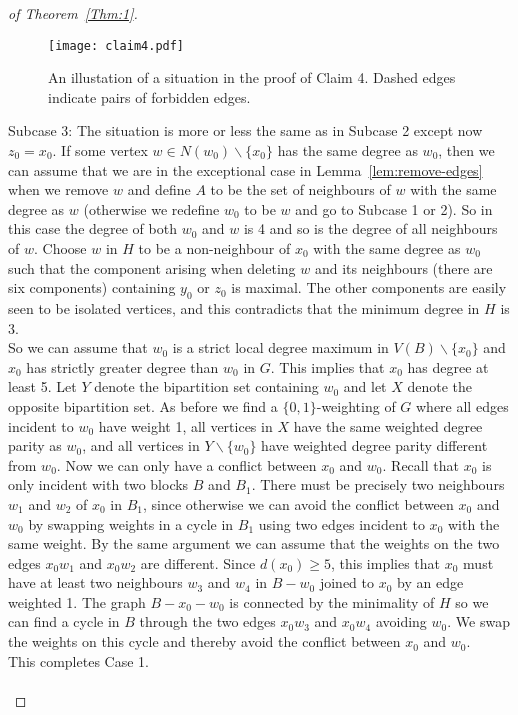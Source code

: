\documentclass[
final,
 nomarks,
]{dmtcs-episciences}
\theoremstyle{definition}
\begin{document}
\begin{proof}[of Theorem~\ref{Thm:1}]
\begin{figure}[H]
\centering
\texttt{[image: claim4.pdf]}
\caption{An illustation of a situation in the proof of Claim 4. Dashed edges indicate pairs of forbidden edges.}
\label{fig:claim4}
\end{figure}
\noindent Subcase 3: The situation is more or less the same as in Subcase 2 except now $z_0=x_0$. If some vertex $w \in N(w_0)\backslash \{x_0\}$ has the same degree as $w_0$, then we can assume that we are in the exceptional case in Lemma~\ref{lem:remove-edges} when we remove $w$ and define $A$ to be the set of neighbours of $w$ with the same degree as $w$ (otherwise we redefine $w_0$ to be $w$ and go to Subcase 1 or 2). So in this case the degree of both $w_0$ and $w$ is 4 and so is the degree of all neighbours of $w$. Choose $w$ in $H$ to be a non-neighbour of $x_0$ with the same degree as $w_0$ such that the component arising when deleting $w$ and its neighbours (there are six components) containing $y_0$ or $z_0$ is maximal. The other components are easily seen to be isolated vertices, and this contradicts that the minimum degree in $H$ is 3. \\ 
So we can assume that $w_0$ is a strict local degree maximum in $V(B)\backslash \{x_0\}$ and $x_0$ has strictly greater degree than $w_0$ in $G$. This implies that $x_0$ has degree at least 5. Let $Y$ denote the bipartition set containing $w_0$ and let $X$ denote the opposite bipartition set. As before we find a $\{0,1\}$-weighting of $G$ where all edges incident to $w_0$ have weight 1, all vertices in $X$ have the same weighted degree parity as $w_0$, and all vertices in $Y\backslash \{w_0\}$ have weighted degree parity different from $w_0$. Now we can only have a conflict between $x_0$ and $w_0$. Recall that $x_0$ is only incident with two blocks $B$ and $B_1$. There must be precisely two neighbours $w_1$ and $w_2$ of $x_0$ in $B_1$, since otherwise we can avoid the conflict between $x_0$ and $w_0$ by swapping weights in a cycle in $B_1$ using two edges incident to $x_0$ with the same weight. By the same argument we can assume that the weights on the two edges $x_0w_1$ and $x_0w_2$ are different. Since $d(x_0) \geq 5$, this implies that $x_0$ must have at least two neighbours $w_3$ and $w_4$ in $B-w_0$ joined to $x_0$ by an edge weighted 1. The graph $B-x_0-w_0$ is connected by the minimality of $H$ so we can find a cycle in $B$ through the two edges $x_0w_3$ and $x_0w_4$ avoiding $w_0$. We swap the weights on this cycle and thereby avoid the conflict between $x_0$ and $w_0$.
\\ 
This completes Case 1. \\ \\

\end{proof}
\end{document}
